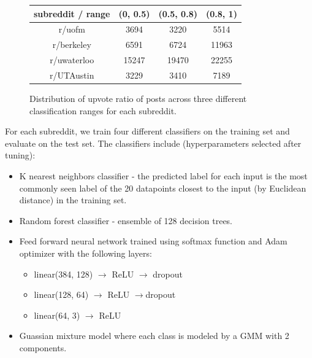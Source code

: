 \documentclass[11pt,a4paper]{article}
\begin{document}
        \begin{figure}
            \begin{tabular}{ |c|c|c|c| }
                \hline
                subreddit / range& (0, 0.5) & (0.5, 0.8) & (0.8, 1) \\
                \hline
                r/uofm & 3694 & 3220 & 5514 \\
                \hline
                r/berkeley & 6591 & 6724 & 11963 \\
                \hline
                r/uwaterloo & 15247 & 19470 & 22255 \\
                \hline
                r/UTAustin & 3229 & 3410 & 7189 \\
                \hline
            \end{tabular}
            \caption{Distribution of upvote ratio of posts across three different classification ranges for each subreddit.}
            \label{fig:ranges}
        \end{figure}

        For each subreddit, we train four different classifiers on the training set and evaluate on the test set. The classifiers include (hyperparameters selected after tuning):

        \begin{itemize}
            \item K nearest neighbors classifier - the predicted label for each input is the most commonly seen label of the 20 datapoints closest to the input (by Euclidean distance) in the training set.
            \item Random forest classifier - ensemble of 128 decision trees.
            \item Feed forward neural network trained using softmax function and Adam optimizer with the following layers:
            \begin{itemize}
                \item linear(384, 128) $\rightarrow$ ReLU $\rightarrow$ dropout
                \item linear(128, 64) $\rightarrow$ ReLU $\rightarrow$dropout
                \item linear(64, 3) $\rightarrow$ ReLU
            \end{itemize}
            \item Guassian mixture model where each class is modeled by a GMM with 2 components.
        \end{itemize}
        
\end{document}
